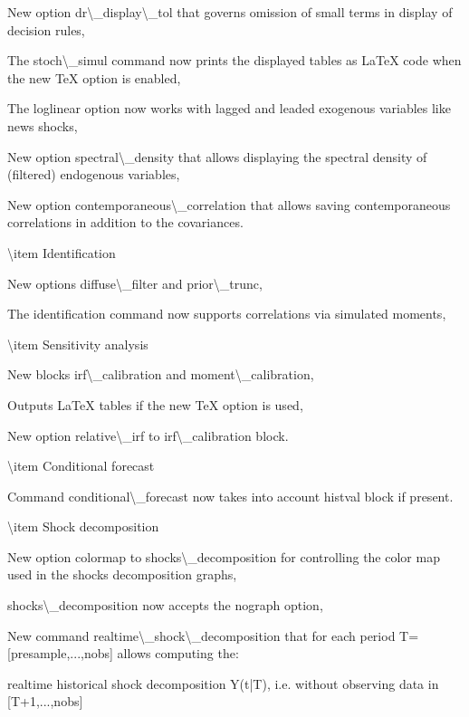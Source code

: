 \documentclass[10pt,math=newtx,citestyle=gb7714-2015,bibstyle=gb7714-2015]{elegantbook}
\begin{document}
	
	New option dr\textbackslash{}\_display\textbackslash{}\_tol that governs omission of small terms in display of decision rules,
	
	
	The stoch\textbackslash{}\_simul command now prints the displayed tables as LaTeX code when the new TeX option is enabled,
	
	
	The loglinear option now works with lagged and leaded exogenous variables like news shocks,
	
	
	New option spectral\textbackslash{}\_density that allows displaying the spectral density of (filtered) endogenous variables,
	
	
	New option contemporaneous\textbackslash{}\_correlation that allows saving contemporaneous correlations in addition to the covariances.
	
	
	
	
	\textbackslash{}item Identification
	
	
	New options diffuse\textbackslash{}\_filter and prior\textbackslash{}\_trunc,
	
	
	The identification command now supports correlations via simulated moments,
	
	
	
	
	\textbackslash{}item Sensitivity analysis
	
	
	New blocks irf\textbackslash{}\_calibration and moment\textbackslash{}\_calibration,
	
	
	Outputs LaTeX tables if the new TeX option is used,
	
	
	New option relative\textbackslash{}\_irf to irf\textbackslash{}\_calibration block.
	
	
	
	
	\textbackslash{}item Conditional forecast
	
	Command conditional\textbackslash{}\_forecast now takes into account histval block if present.
	
	
	
	\textbackslash{}item Shock decomposition
	
	
	New option colormap to shocks\textbackslash{}\_decomposition for controlling the color map used in the shocks decomposition graphs,
	
	
	shocks\textbackslash{}\_decomposition now accepts the nograph option,
	
	
	New command realtime\textbackslash{}\_shock\textbackslash{}\_decomposition that for each period T= [presample,...,nobs] allows computing the:
	
	
	realtime historical shock decomposition Y(t|T), i.e. without observing data in [T+1,...,nobs]
	
\end{document}
